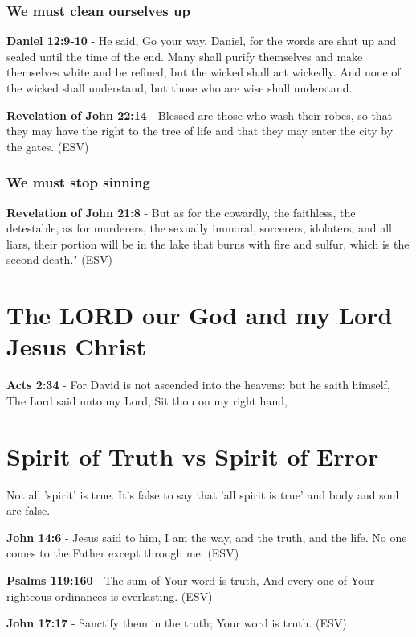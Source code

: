 \documentclass[11pt]{article}
\begin{document}
\subsubsection{We must clean ourselves up}
\label{sec:org87658ce}
\textbf{Daniel 12:9-10} - He said, Go your way, Daniel, for the words are shut up and sealed until the time of the end.  Many shall purify themselves and make themselves white and be refined, but the wicked shall act wickedly. And none of the wicked shall understand, but those who are wise shall understand.

\textbf{Revelation of John 22:14} - Blessed are those who wash their robes, so that they may have the right to the tree of life and that they may enter the city by the gates. (ESV)

\subsubsection{We must stop sinning}
\label{sec:org0d0bae5}

\textbf{Revelation of John 21:8} - But as for the cowardly, the faithless, the detestable, as for murderers, the sexually immoral, sorcerers, idolaters, and all liars, their portion will be in the lake that burns with fire and sulfur, which is the second death." (ESV)

\section{The LORD our God and my Lord Jesus Christ}
\label{sec:org2faf3ff}
\textbf{Acts 2:34} - For David is not ascended into the heavens: but he saith himself, The Lord said unto my Lord, Sit thou on my right hand,

\section{Spirit of Truth vs Spirit of Error}
\label{sec:orgca949c8}
Not all 'spirit' is true.
It's false to say that 'all spirit is true' and body and soul are false.

\textbf{John 14:6} - Jesus said to him, I am the way, and the truth, and the life. No one comes to the Father except through me. (ESV)

\textbf{Psalms 119:160} - The sum of Your word is truth, And every one of Your righteous ordinances is everlasting. (ESV)

\textbf{John 17:17} - Sanctify them in the truth; Your word is truth. (ESV)
\end{document}
